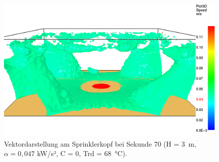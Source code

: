 \begin{figure}[h]
    \centering
    \includegraphics[width=\textwidth]{images/FDSBilder/PlotEcken.png}
    \caption{Vektordarstellung am Sprinklerkopf bei Sekunde 70 (H = 3~m, $\alpha=0,047$ kW/s², C = 0, Trd = 68~°C).}
    \label{fig:PlotEcken}
\end{figure}













